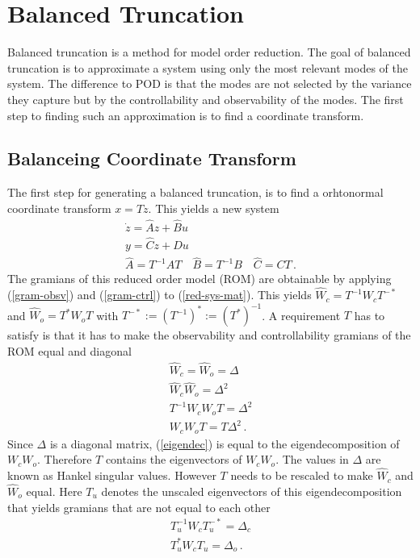 \section{Balanced Truncation} \label{bt}
Balanced truncation is a method for model order reduction.
The goal of balanced truncation is to approximate a system using only the most relevant modes of the system.
The difference to POD is that the modes are not selected by the variance they capture but by the controllability and observability of the modes.
The first step to finding such an approximation is to find a coordinate transform.
\subsection{Balanceing Coordinate Transform} \label{balre}
The first step for generating a balanced truncation, is to find a orhtonormal coordinate transform \(x = Tz\).
This yields a new system
\begin{gather}
\dot{z} = \hat{A}z + \hat{B}u \label{z1}\\
y = \hat{C}z + Du \label{z2} \\
\hat{A} = T^{-1}AT \quad \hat{B} = T^{-1}B \quad \hat{C} = CT \,.\label{red-sys-mat}
\end{gather}
The gramians of this reduced order model (ROM) are obtainable by applying  (\ref{gram-obsv}) and (\ref{gram-ctrl}) to (\ref{red-sys-mat}).
This yields \(\hat{W}_c = T^{-1}W_cT^{-*}\) and \(\hat{W}_o = T^{*}W_oT\) with  \(T^{-*} := (T^{-1})^{*} := (T^{*})^{-1}\).
A requirement \(T\) has to satisfy is that it has to make the observability and controllability gramians of the ROM equal and diagonal
\begin{gather}
\hat{W}_c = \hat{W}_o = \Delta \\
\hat{W}_c \hat{W}_o = \Delta^{2} \\
T^{-1}W_cW_oT = \Delta^{2} \\
W_cW_oT = T\Delta^{2}  \,. \label{eigendec}
\end{gather}
Since \(\Delta\) is a diagonal matrix, (\ref{eigendec}) is equal to the eigendecomposition of \(W_cW_o\).
Therefore \(T\) contains the eigenvectors of \(W_cW_o\).
The values in \(\Delta\) are known as Hankel singular values.
However \(T\) needs to be rescaled to make \(\hat{W}_c\) and \(\hat{W}_o\) equal.
Here \(T_u\) denotes the unscaled eigenvectors of this eigendecomposition that yields gramians that are not equal to each other
\begin{gather}
T_u^{-1}W_cT_u^{-*} = \Delta_c \label{e1}\\
T_u^{*}W_cT_u = \Delta_o  \,. \label{e2}
\end{gather}
